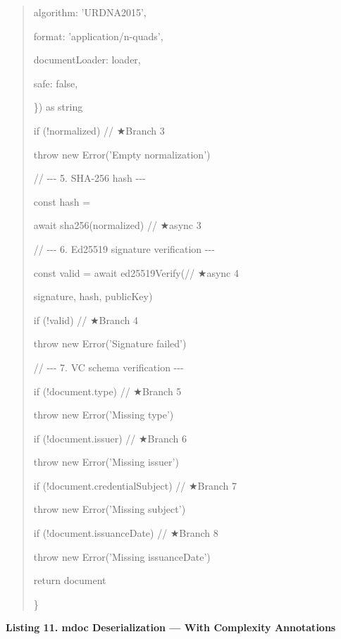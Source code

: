 \documentclass[conference]{IEEEtran}
\begin{document}
\begin{quote}
algorithm: 'URDNA2015',

format: 'application/n-quads',

documentLoader: loader,

safe: false,

\}) as string

if (!normalized) // ★Branch 3

throw new Error('Empty normalization')

// -\/-\/- 5. SHA-256 hash -\/-\/-

const hash =

await sha256(normalized) // ★async 3

// -\/-\/- 6. Ed25519 signature verification -\/-\/-

const valid = await ed25519Verify(// ★async 4

signature, hash, publicKey)

if (!valid) // ★Branch 4

throw new Error('Signature failed')

// -\/-\/- 7. VC schema verification -\/-\/-

if (!document.type) // ★Branch 5

throw new Error('Missing type')

if (!document.issuer) // ★Branch 6

throw new Error('Missing issuer')

if (!document.credentialSubject) // ★Branch 7

throw new Error('Missing subject')

if (!document.issuanceDate) // ★Branch 8

throw new Error('Missing issuanceDate')

return document

\}
\end{quote}

\textbf{Listing 11. mdoc Deserialization --- With Complexity Annotations}
\end{document}
